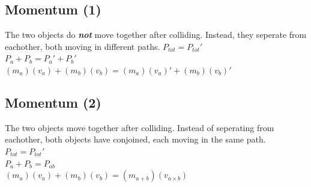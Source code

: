 \documentclass{article}
\begin{document}
\begin{adjustwidth}{1cm}{0pt}
    \subsection{Momentum (1)}
    \begin{flushleft}
        The two objects do \textbf{\textit{not}} move together after colliding. Instead, they seperate from eachother, both moving in different paths.\newline\newline
        $P_{tot} = P_{tot}\prime$ \\
        \vspace*{10pt}
        $P_{a} + P_{b} = P_{a}\prime + P_{b}\prime$ \\
        \vspace*{10pt}
        $(m_{a})(v_{a}) + (m_{b})(v_{b}) = (m_{a})(v_{a})\prime + (m_{b})(v_{b})\prime$
    \end{flushleft}
    \vspace*{0.03cm}
    \subsection{Momentum (2)}
    \begin{flushleft}
        The two objects move together after colliding. Instead of seperating from eachother, both objects have conjoined, each moving in the same path.\newline\newline
        $P_{tot} = P_{tot}\prime$ \\
        \vspace*{10pt}
        $P_{a} + P_{b} = P_{ab}$ \\
        \vspace*{10pt}
        $(m_{a})(v_{a}) + (m_{b})(v_{b}) = (m_{a + b})(v_{a\times b})$
    \end{flushleft}
\end{adjustwidth}
\end{document}
